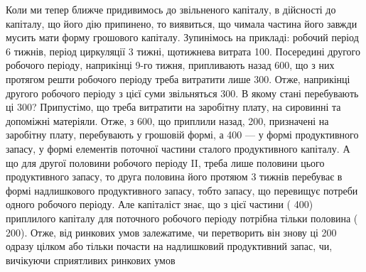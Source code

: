 Коли ми тепер ближче придивимось до звільненого капіталу, в дійсності
до капіталу, що його дію припинено, то виявиться, що чимала
частина його завжди мусить мати форму грошового капіталу. Зупинімось
на прикладі: робочий період 6 тижнів, період циркуляції 3 тижні, щотижнева
витрата 100. Посередині другого робочого періоду,
наприкінці 9-го тижня, припливають назад 600, що з них протягом
решти робочого періоду треба витратити лише 300.
Отже, наприкінці другого робочого періоду з цієї суми звільняться
300. В якому стані перебувають ці 300? Припустімо,
що  треба витратити на заробітну плату,  на сировинні та допоміжні
матеріяли. Отже, з 600, що приплили назад, 200, призначені
на заробітну плату, перебувають у грошовій формі, а 400 — у формі продуктивного запасу, у формі елементів поточної
частини сталого продуктивного капіталу. А що для другої половини
робочого періоду II, треба лише половини цього продуктивного запасу,
то друга половина його протяюм 3 тижнів перебуває в формі надлишкового
продуктивного запасу, тобто запасу, що перевищує потреби одного
робочого періоду. Але капіталіст знає, що з цієї частини (\deq{} 400)
приплилого капіталу для поточного робочого періоду потрібна тільки
половина (\deq{} 200). Отже, від ринкових умов залежатиме, чи
перетворить він знову ці 200 одразу цілком або тільки почасти на
надлишковий продуктивний запас, чи, вичікуючи сприятливих ринкових умов
\parbreak{}  %
